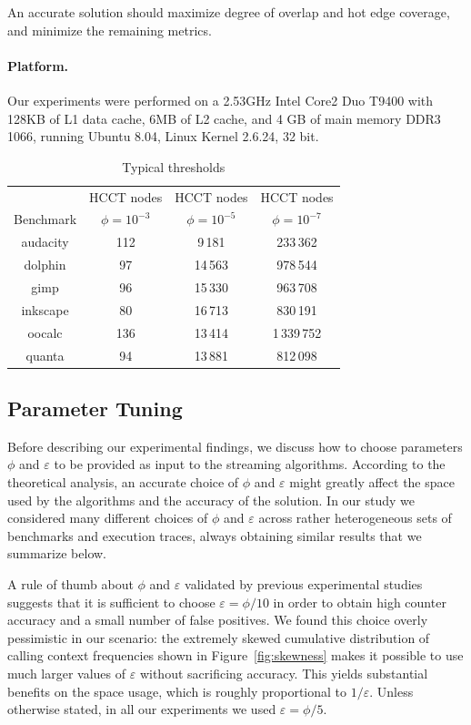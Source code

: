 \documentclass[preprint]{sigplanconf}
\begin{document}
\noindent An accurate solution should maximize degree of overlap and hot edge coverage, and minimize the remaining metrics.

\paragraph{Platform.}  Our experiments were performed on a 2.53GHz Intel Core2 Duo T9400 with 128KB of L1 data cache, 6MB of L2 cache, and 4 GB of main memory DDR3 1066, running Ubuntu 8.04, Linux Kernel 2.6.24, 32 bit.

\begin{table}[t]
\caption{Typical thresholds}
\centering
\begin{small}
\begin{tabular}{c c c c}
\hline\hline
  & HCCT nodes  & HCCT nodes & HCCT nodes \\ 
Benchmark & $\phi=10^{-3}$  & $\phi=10^{-5}$ & $\phi=10^{-7}$ \\ 
\hline
audacity & 112 & 9\,181 & 233\,362 \\
dolphin & 97 & 14\,563 & 978\,544 \\
gimp & 96 & 15\,330 & 963\,708 \\
inkscape & 80 & 16\,713 & 830\,191 \\
oocalc & 136 & 13\,414 & 1\,339\,752 \\
quanta & 94 & 13\,881 & 812\,098 \\
\hline
\end{tabular}
\end{small}
\label{tab:phi}
\end{table}


\subsection{Parameter Tuning}
\label{ss:tuning}

Before describing our experimental findings, we discuss how to choose parameters $\phi$ and $\varepsilon$ to be provided as input to the streaming algorithms. According to the theoretical analysis, an accurate choice of $\phi$ and $\varepsilon$  might greatly affect the space used by the algorithms and the accuracy of the solution. In our study we considered many different choices of $\phi$ and $\varepsilon$ across rather heterogeneous sets of benchmarks and execution traces, always obtaining similar results that we summarize below. 

A rule of thumb about $\phi$ and $\varepsilon$ validated by previous experimental studies~\cite{CH08} suggests that it is sufficient to choose $\varepsilon=\phi/10$ in order to obtain high counter accuracy and a small number of false positives. We found this choice overly pessimistic in our scenario: the extremely skewed cumulative distribution of calling context frequencies shown in Figure~\ref{fig:skewness} makes it possible to use much larger values of $\varepsilon$ without sacrificing accuracy. This yields substantial benefits on the space usage, which is roughly proportional to $1/\varepsilon$. Unless otherwise stated, in all our experiments we used $\varepsilon=\phi/5$.
\end{document}
